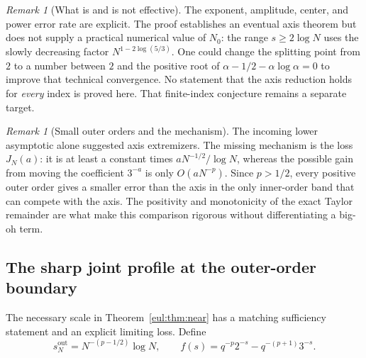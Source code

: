 \documentclass[11pt]{article}
\numberwithin{equation}{section}
\theoremstyle{definition}
\theoremstyle{remark}
\newtheorem{remark}[theorem]{Remark}
\begin{document}
\begin{remark}[What is and is not effective]
The exponent, amplitude, center, and power error rate are explicit.
The proof establishes an eventual axis theorem but does not supply a
practical numerical value of $N_0$: the range
$s\geq2\log N$ uses the slowly decreasing factor
$N^{1-2\log(5/3)}$.  One could change the splitting point from $2$
to a number between $2$ and the positive root of
$\alpha-1/2-\alpha\log\alpha=0$ to improve that technical convergence.
No statement that the axis reduction holds for \emph{every} index is
proved here.  That finite-index conjecture remains a separate target.
\end{remark}

\begin{remark}[Small outer orders and the mechanism]
The incoming lower asymptotic alone suggested axis extremizers.
The missing mechanism is the loss $J_N(a)$: it is at least a constant
times $aN^{-1/2}/\log N$, whereas the possible gain from moving the
coefficient $3^{-a}$ is only $O(aN^{-p})$.
Since $p>1/2$, every positive outer order gives a smaller error than the axis in the
only inner-order band that can compete with the axis.
The positivity and monotonicity of the exact Taylor remainder are
what make this comparison rigorous without differentiating a big-oh term.
\end{remark}

\subsection{The sharp joint profile at the outer-order boundary}

The necessary scale in Theorem~\ref{eul:thm:near} has a matching
sufficiency statement and an explicit limiting loss. Define
\[
 s_N^{\mathrm{out}}=N^{-(p-1/2)}\log N,
 \qquad f(s)=q^{-p}2^{-s}-q^{-(p+1)}3^{-s}.
\]
\end{document}
